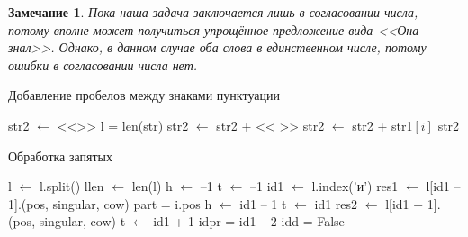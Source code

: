 \documentclass[a4paper,12pt]{article} %
\theoremstyle{definition}
\theoremstyle{plain}
\newtheorem{R}{Замечание}
\renewcommand{\ge}{\geqslant}
\renewcommand{\le}{\leqslant}
\begin{document}
\begin{R}
	Пока наша задача заключается лишь в согласовании числа, потому вполне может получиться упрощённое предложение вида <<Она знал>>. Однако, в данном случае оба слова в единственном числе, потому ошибки в согласовании числа нет.
\end{R}


\begin{algorithm}
\caption{Добавление пробелов между знаками пунктуации}
\begin{algorithmic}[1]
\State str2 $\gets $ <<>> 
\State l = len(str)
\State str2 $\gets$ str2 + << >>
\EndIf
\State str2 $\gets$ str2 + str1$[i]$
\EndFor
\State\Return str2
\EndFunction
\end{algorithmic}
\end{algorithm}
\newpage
\begin{algorithm}
	\caption{Обработка запятых}
	\begin{algorithmic}[1]
		 
		\State l $\gets$ l.split()
		\State llen $\gets$ len(l) 
		\State h $\gets$ --1 
		\State t $\gets$ --1 
		\State id1 $\gets$ l.index('и') 
		\State res1 $\gets$ l[id1 -- 1].(pos, singular, cow) 
		\State part = i.pos 
		\State h $\gets $ id1 -- 1 
		\State t $\gets$ id1 
		 
		\If{id1 + 1 $\le$ llen}
		\State res2 $\gets$ l[id1 + 1].(pos, singular, cow) 
		 
		\State t $\gets$ id1 + 1
		\EndIf
		\State idpr = id1 -- 2 
		\State idd = False 
		\While{idpr $\ge$ 0}
		\EndWhile
		\EndIf
		\EndIf
		\EndFor
		\EndIf
		\EndWhile
		\EndFunction
		 \end{algorithmic}
	\end{algorithm}
 
\end{document}
